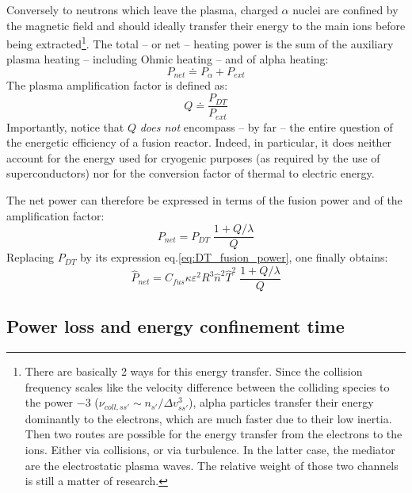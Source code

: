 Conversely to neutrons which leave the plasma, charged $\alpha$ nuclei are confined by the magnetic field and should ideally transfer their energy to the main ions before being extracted\footnote{There are basically 2 ways for this energy transfer. Since the collision frequency scales like the velocity difference between the colliding species to the power $-3$ ($\nu_{coll,ss'}\sim n_{s'}/\Delta v_{ss'}^3$), alpha particles transfer their energy dominantly to the electrons, which are much faster due to their low inertia. Then two routes are possible for the energy transfer from the electrons to the ions. Either via collisions, or via turbulence. In the latter case, the mediator are the electrostatic plasma waves. The relative weight of those two channels is still a matter of research.}. The total -- or net -- heating power is the sum of the auxiliary plasma heating -- including Ohmic heating -- and of alpha heating:
\begin{equation}
P_{net} \doteq P_\alpha + P_{ext}
\label{eq:net_power}
\end{equation}
The plasma amplification factor is defined as:
\begin{equation}
Q \doteq \frac{P_{DT}}{P_{ext}}
\label{eq:Q}
\end{equation}
Importantly, notice that $Q$ \emph{does not} encompass -- by far -- the entire question of the energetic efficiency of a fusion reactor. Indeed, in particular, it does neither account for the energy used for cryogenic purposes (as required by the use of superconductors) nor for the conversion factor of thermal to electric energy.

The net power can therefore be expressed in terms of the fusion power and of the amplification factor:
\begin{equation}
\boxed{
P_{net} = P_{DT} \; \frac{1+Q/\lambda}{Q}
}
\label{eq:Pnet_PDT_Q}
\end{equation}
Replacing $P_{DT}$ by its expression eq.\ref{eq:DT_fusion_power}, one finally obtains:
\begin{equation}
  \hat P_{net} = C_{fus} \kappa \varepsilon^2 R^3 \hat n^2 \hat T^2 \; \frac{1+Q/\lambda}{Q}
\label{eq:Pnet_QnTR}
\end{equation}


\subsection{Power loss and energy confinement time}


